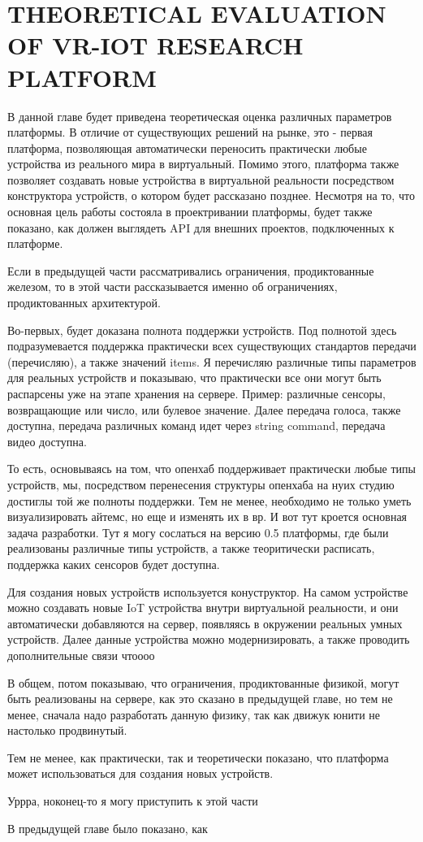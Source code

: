 
\chapter{THEORETICAL EVALUATION OF VR-IOT RESEARCH PLATFORM}
В данной главе будет приведена теоретическая оценка различных параметров платформы. В отличие от существующих решений на рынке, это - первая платформа, позволяющая автоматически переносить практически любые устройства из реального мира в виртуальный. Помимо этого, платформа также позволяет создавать новые устройства в виртуальной реальности посредством конструктора устройств, о котором будет рассказано позднее. Несмотря на то, что основная цель работы состояла в проектривании платформы, будет также показано, как должен выглядеть API для внешних проектов, подключенных к платформе.

Если в предыдущей части рассматривались ограничения, продиктованные железом, то в этой части рассказывается именно об ограничениях, продиктованных архитектурой.

Во-первых, будет доказана полнота поддержки устройств. Под полнотой здесь подразумевается поддержка практически всех существующих стандартов передачи (перечисляю), а также значений items. Я перечисляю различные типы параметров для реальных устройств и показываю, что практически все они могут быть распарсены уже на этапе хранения на сервере. Пример: различные сенсоры, возвращающие или число, или булевое значение. Далее передача голоса, также доступна, передача различных команд идет через string command, передача видео доступна.

То есть, основываясь на том, что опенхаб поддерживает практически любые типы устройств, мы, посредством перенесения структуры опенхаба на нуих студию достиглы той же полноты поддержки. Тем не менее, необходимо не только уметь визуализировать айтемс, но еще и изменять их в вр. И вот тут кроется основная задача разработки. Тут я могу сослаться на версию 0.5 платформы, где были реализованы различные типы устройств, а также теоритически расписать, поддержка каких сенсоров будет доступна.

Для создания новых устройств используется конуструктор. На самом устройстве можно создавать новые IoT устройства внутри виртуальной реальности, и они автоматически добавляются на сервер, появляясь в окружении реальных умных устройств. Далее данные устройства можно модернизировать, а также проводить дополнительные связи чтоооо

В общем, потом показываю, что ограничения, продиктованные физикой, могут быть реализованы на сервере, как это сказано в предыдущей главе, но тем не менее, сначала надо разработать данную физику, так как движук юнити не настолько продвинутый.

Тем не менее, как практически, так и теоретически показано, что платформа может использоваться для создания новых устройств.



Уррра, ноконец-то я могу приступить к этой части


В предыдущей главе было показано, как 
